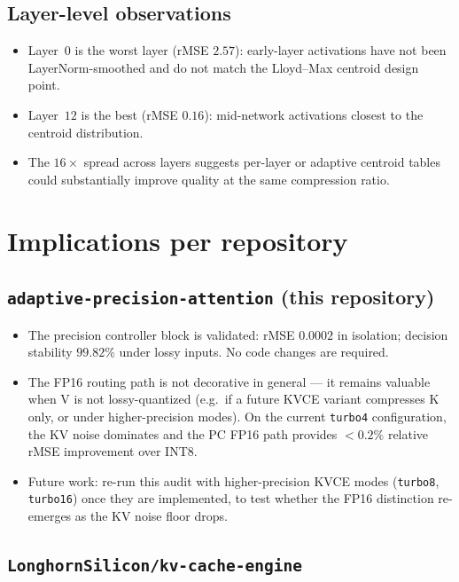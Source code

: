 \documentclass[11pt]{article}
\begin{document}
\subsection*{Layer-level observations}

\begin{itemize}
\item Layer~$0$ is the worst layer (rMSE $2.57$): early-layer
activations have not been LayerNorm-smoothed and do not match
the Lloyd--Max centroid design point.
\item Layer~$12$ is the best (rMSE $0.16$): mid-network activations
closest to the centroid distribution.
\item The $16\times$ spread across layers suggests per-layer or
adaptive centroid tables could substantially improve quality at
the same compression ratio.
\end{itemize}

\section{Implications per repository}
\label{sec:implications}

\subsection{\texttt{adaptive-precision-attention} (this repository)}

\begin{itemize}
\item The precision controller block is validated: rMSE $0.0002$
in isolation; decision stability $99.82\%$ under lossy inputs.
No code changes are required.
\item The FP16 routing path is not decorative in general --- it
remains valuable when V is not lossy-quantized (e.g.\ if a future
KVCE variant compresses K only, or under higher-precision modes).
On the current \texttt{turbo4} configuration, the KV noise
dominates and the PC FP16 path provides $< 0.2\%$ relative rMSE
improvement over INT8.
\item Future work: re-run this audit with higher-precision KVCE
modes (\texttt{turbo8}, \texttt{turbo16}) once they are implemented,
to test whether the FP16 distinction re-emerges as the KV noise
floor drops.
\end{itemize}

\subsection{\texttt{LonghornSilicon/kv-cache-engine}}
\end{document}

